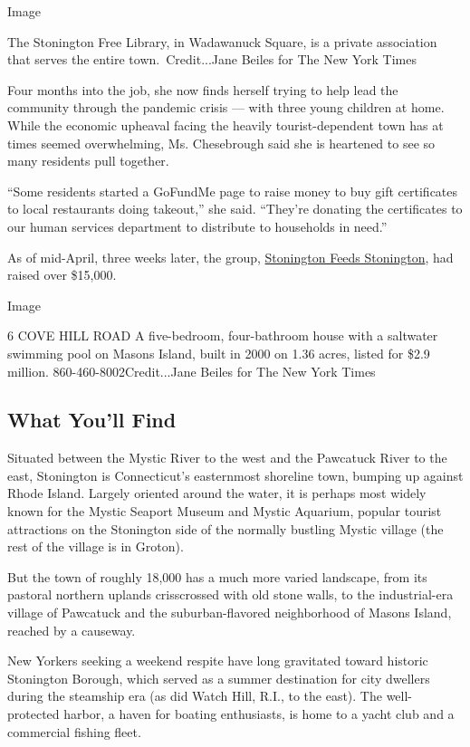 Image

The Stonington Free Library, in Wadawanuck Square, is a private
association that serves the entire town.~Credit...Jane Beiles for The
New York Times

Four months into the job, she now finds herself trying to help lead the
community through the pandemic crisis --- with three young children at
home. While the economic upheaval facing the heavily tourist-dependent
town has at times seemed overwhelming, Ms. Chesebrough said she is
heartened to see so many residents pull together.

``Some residents started a GoFundMe page to raise money to buy gift
certificates to local restaurants doing takeout,'' she said. ``They're
donating the certificates to our human services department to distribute
to households in need.''

As of mid-April, three weeks later, the group,
\href{https://www.facebookcorewwwi.onion/groups/2583619385099118/}{Stonington
Feeds Stonington}, had raised over \$15,000.

Image

6 COVE HILL ROAD \textbar{} A five-bedroom, four-bathroom house with a
saltwater swimming pool on Masons Island, built in 2000 on 1.36 acres,
listed for \$2.9 million. 860-460-8002Credit...Jane Beiles for The New
York Times

\hypertarget{what-youll-find}{%
\subsection{What You'll Find}\label{what-youll-find}}

Situated between the Mystic River to the west and the Pawcatuck River to
the east, Stonington is Connecticut's easternmost shoreline town,
bumping up against Rhode Island. Largely oriented around the water, it
is perhaps most widely known for the Mystic Seaport Museum and Mystic
Aquarium, popular tourist attractions on the Stonington side of the
normally bustling Mystic village (the rest of the village is in Groton).

But the town of roughly 18,000 has a much more varied landscape, from
its pastoral northern uplands crisscrossed with old stone walls, to the
industrial-era village of Pawcatuck and the suburban-flavored
neighborhood of Masons Island, reached by a causeway.

New Yorkers seeking a weekend respite have long gravitated toward
historic Stonington Borough, which served as a summer destination for
city dwellers during the steamship era (as did Watch Hill, R.I., to the
east). The well-protected harbor, a haven for boating enthusiasts, is
home to a yacht club and a commercial fishing fleet.

